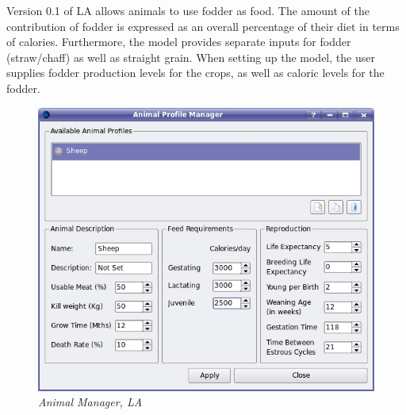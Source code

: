       Version 0.1 of LA allows animals to use fodder as food.  The amount of the
      contribution of fodder is expressed as an overall percentage of their diet
      in terms of calories.  Furthermore, the model provides separate inputs for
      fodder (straw/chaff) as well as straight grain.  When setting up the
      model, the user supplies fodder production levels for the crops, as well as
      caloric levels for the fodder.
\begin{figure}[htbp]
  \includegraphics[scale=.38]{./images/animalManager.jpg}
  \caption{\label{fig:animalManager}\textit{Animal Manager, LA}}
\end{figure}
